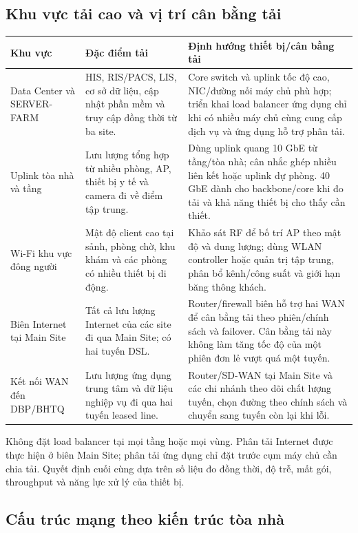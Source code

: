 \subsection{Khu vực tải cao và vị trí cân bằng tải}

\begin{tabularx}{\textwidth}{|X|X|X|}
\hline
\textbf{Khu vực} & \textbf{Đặc điểm tải} & \textbf{Định hướng thiết bị/cân bằng tải} \\
\hline
Data Center và SERVER-FARM & HIS, RIS/PACS, LIS, cơ sở dữ liệu, cập nhật phần mềm và truy cập đồng thời từ ba site. & Core switch và uplink tốc độ cao, NIC/đường nối máy chủ phù hợp; triển khai load balancer ứng dụng chỉ khi có nhiều máy chủ cùng cung cấp dịch vụ và ứng dụng hỗ trợ phân tải. \\
\hline
Uplink tòa nhà và tầng & Lưu lượng tổng hợp từ nhiều phòng, AP, thiết bị y tế và camera đi về điểm tập trung. & Dùng uplink quang 10 GbE từ tầng/tòa nhà; cân nhắc ghép nhiều liên kết hoặc uplink dự phòng. 40 GbE dành cho backbone/core khi đo tải và khả năng thiết bị cho thấy cần thiết. \\
\hline
Wi-Fi khu vực đông người & Mật độ client cao tại sảnh, phòng chờ, khu khám và các phòng có nhiều thiết bị di động. & Khảo sát RF để bố trí AP theo mật độ và dung lượng; dùng WLAN controller hoặc quản trị tập trung, phân bổ kênh/công suất và giới hạn băng thông khách. \\
\hline
Biên Internet tại Main Site & Tất cả lưu lượng Internet của các site đi qua Main Site; có hai tuyến DSL. & Router/firewall biên hỗ trợ hai WAN để cân bằng tải theo phiên/chính sách và failover. Cân bằng tải này không làm tăng tốc độ của một phiên đơn lẻ vượt quá một tuyến. \\
\hline
Kết nối WAN đến DBP/BHTQ & Lưu lượng ứng dụng trung tâm và dữ liệu nghiệp vụ đi qua hai tuyến leased line. & Router/SD-WAN tại Main Site và các chi nhánh theo dõi chất lượng tuyến, chọn đường theo chính sách và chuyển sang tuyến còn lại khi lỗi. \\
\hline
\end{tabularx}

Không đặt load balancer tại mọi tầng hoặc mọi vùng. Phân tải Internet được thực hiện ở biên Main Site; phân tải ứng dụng chỉ đặt trước cụm máy chủ cần chia tải. Quyết định cuối cùng dựa trên số liệu đo đồng thời, độ trễ, mất gói, throughput và năng lực xử lý của thiết bị.

\subsection{Cấu trúc mạng theo kiến trúc tòa nhà}

